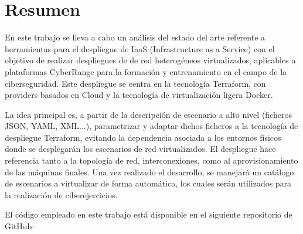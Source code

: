 \newpage
\thispagestyle{plain}
\section*{Resumen}

En este trabajo se lleva a cabo un análisis del estado del arte referente a herramientas para el despliegue de IaaS (Infrastructure as a Service) con el objetivo de realizar despliegues de de red heterogéneos virtualizados, aplicables a plataformas CyberRange para la formación y entrenamiento en el campo de la ciberseguridad. Este despliegue se centra en la tecnología Terraform, con providers basados en Cloud y la tecnología de virtualización ligera Docker.

La idea principal es, a partir de la descripción de escenario a alto nivel (ficheros JSON, YAML, XML...), parametrizar y adaptar dichos ficheros a la tecnología de despliegue Terraform, evitando la dependencia asociada a los entornos físicos donde se desplegarán los escenarios de red virtualizados. El despliegue hace referencia tanto a la topología de red, interconexiones, como al aprovisionamiento de las máquinas finales. Una vez realizado el desarrollo, se manejará un catálogo de escenarios a virtualizar de forma automática, los cuales serán utilizados para la realización de ciberejercicios.

El código empleado en este trabajo está disponible en el siguiente repositorio de GitHub:

\vspace{0.2cm}

\begin{tcolorbox}[colback=orange!5!white,colframe=orange!75!black]
  \centering\href{https://github.com/samugs13/daerv}{\textbf{\color{blue}{https://github.com/samugs13/daerv}}}
\end{tcolorbox}

\afterpage{\blankpage}
